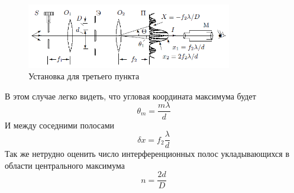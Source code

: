 \documentclass[a4paper, 12pt]{article}%
\begin{document}
\begin{figure}[h]
\begin{center}
\includegraphics[width = 0.8\textwidth]{4.png}
\caption{Установка для третьего пункта}
\end{center}
\end{figure}

В этом случае легко видеть, что угловая координата максимума будет 
\begin{equation}
\theta_m = \frac{m \lambda}{d}
\end{equation}
И между соседними полосами 
\begin{equation}
\delta x = f_2 \frac{\lambda}{d}
\end{equation}
Так же нетрудно оценить число интерференционных полос укладывающихся в области центрального максимума 
\begin{equation}
n = \frac{2d}{D}
\end{equation}
\end{document}
